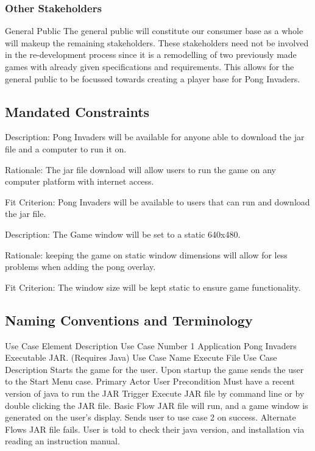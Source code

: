 \documentclass[12pt, titlepage]{article}
\begin{document}
\subsubsection{Other Stakeholders}
General Public
The general public will constitute our consumer base as a whole will makeup the remaining stakeholders. These stakeholders need not be involved in the re-development process since it is a remodelling of two previously made games with already given specifications and requirements. This allows for the general public to be focussed towards creating a player base for Pong Invaders. 
\subsection{Mandated Constraints}
Description: Pong Invaders will be available for anyone able to download the jar file and a computer to run it on.
 
Rationale: The jar file download will allow users to run the game on any computer platform with internet access.
 
Fit Criterion: Pong Invaders will be available to users that can run and download the jar file.
 

Description: The Game window will be set to a static 640x480.
 
Rationale: keeping the game on static window dimensions will allow for less problems when adding the pong overlay.
 
Fit Criterion: The window size will be kept static to ensure game functionality.

\subsection{Naming Conventions and Terminology}

Use Case Element
Description
Use Case Number
1
Application
Pong Invaders Executable JAR. (Requires Java)
Use Case Name
Execute File
Use Case Description
Starts the game for the user. Upon startup the game sends the user to the Start Menu case.
Primary Actor
User 
Precondition
Must have a recent version of java to run the JAR
Trigger
Execute JAR file by command line or by double clicking the JAR file.
Basic Flow
JAR file will run, and a game window is generated on the user’s display. Sends user to use case 2 on success.
Alternate Flows
JAR file fails. User is told to check their java version, and installation via reading an instruction manual.
\end{document}
